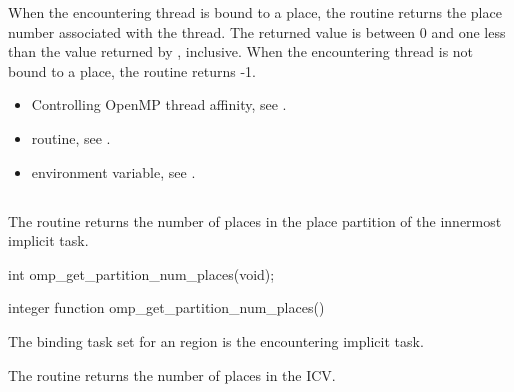 \effect
When the encountering thread is bound to a place, the 
 routine returns the place number associated 
with the thread. The returned value is between 0 and one less than the 
value returned by , inclusive. When the 
encountering thread is not bound to a place, the routine returns -1.

\crossreferences
\begin{itemize}
\item Controlling OpenMP thread affinity, see 
. 

\item {} routine, see 
.

\item {} environment variable, see 
.
\end{itemize}





\subsection{}
\label{subsec:omp_get_partition_num_places}

\summary
The  routine returns the number of places in the place partition 
of the innermost implicit task.

\format
\begin{ccppspecific}
\begin{ompcFunction}
int omp_get_partition_num_places(void);
\end{ompcFunction}
\end{ccppspecific}

\begin{fortranspecific}
\begin{ompfFunction}
integer function omp_get_partition_num_places()
\end{ompfFunction}
\end{fortranspecific}

\binding
The binding task set for an   region is the encountering implicit task.

\effect
The  routine returns the number of places in the  ICV.

